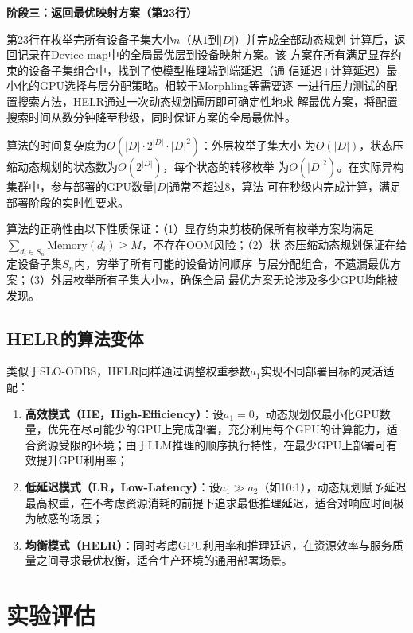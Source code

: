 \textbf{阶段三：返回最优映射方案（第23行）}

第23行在枚举完所有设备子集大小$n$（从$1$到$|D|$）并完成全部动态规划
计算后，返回记录在$\text{Device\_map}$中的全局最优层到设备映射方案。该
方案在所有满足显存约束的设备子集组合中，找到了使模型推理端到端延迟（通
信延迟+计算延迟）最小化的GPU选择与层分配策略。相较于Morphling等需要逐
一进行压力测试的配置搜索方法，HELR通过一次动态规划遍历即可确定性地求
解最优方案，将配置搜索时间从数分钟降至秒级，同时保证方案的全局最优性。

算法的时间复杂度为$O(|D| \cdot 2^{|D|} \cdot |D|^2)$：外层枚举子集大小
为$O(|D|)$，状态压缩动态规划的状态数为$O(2^{|D|})$，每个状态的转移枚举
为$O(|D|^2)$。在实际异构集群中，参与部署的GPU数量$|D|$通常不超过8，算法
可在秒级内完成计算，满足部署阶段的实时性要求。

算法的正确性由以下性质保证：（1）显存约束剪枝确保所有枚举方案均满足
$\sum_{d_i \in S_n} \text{Memory}(d_i) \geq M$，不存在OOM风险；（2）状
态压缩动态规划保证在给定设备子集$S_n$内，穷举了所有可能的设备访问顺序
与层分配组合，不遗漏最优方案；（3）外层枚举所有子集大小$n$，确保全局
最优方案无论涉及多少GPU均能被发现。



\subsection{HELR的算法变体}

类似于SLO-ODBS，HELR同样通过调整权重参数$a_1$实现不同部署目标的灵活适配：
\begin{enumerate}
    \item \textbf{高效模式（HE，High-Efficiency）}：设$a_1 = 0$，动态规划仅最小化GPU数量，优先在尽可能少的GPU上完成部署，充分利用每个GPU的计算能力，适合资源受限的环境；由于LLM推理的顺序执行特性，在最少GPU上部署可有效提升GPU利用率；
    \item \textbf{低延迟模式（LR，Low-Latency）}：设$a_1 \gg a_2$（如10:1），动态规划赋予延迟最高权重，在不考虑资源消耗的前提下追求最低推理延迟，适合对响应时间极为敏感的场景；
    \item \textbf{均衡模式（HELR）}：同时考虑GPU利用率和推理延迟，在资源效率与服务质量之间寻求最优权衡，适合生产环境的通用部署场景。
\end{enumerate}

\section{实验评估}
\label{sec:uellm_eval}

